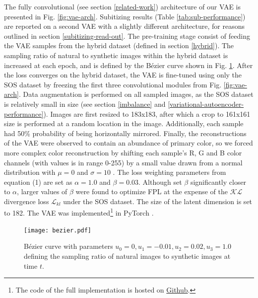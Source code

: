 \documentclass[twocolumn]{article}
\begin{document}
The fully convolutional (see section \ref{related-work}) architecture of our VAE is presented in Fig. \ref{fig:vae-arch}. Subitizing results (Table \ref{tab:sub-performance}) are reported on a second VAE with a slightly different architecture, for reasons outlined in section \ref{subitizing-read-out}.
The pre-training stage consist of feeding the VAE samples from the hybrid dataset (defined in section \ref{hybrid}). The sampling ratio of natural to synthetic images within the hybrid dataset is increased at each epoch, and is defined by the Bézier curve shown in Fig. \ref{fig:bezier}. After the loss converges on the hybrid dataset, the VAE is fine-tuned using only the SOS dataset by freezing the first three convolutional modules from Fig. \ref{fig:vae-arch}.  Data augmentation is performed on all sampled images, as the SOS dataset is relatively small in size (see section \ref{imbalance} and \ref{variational-autoencoder-performance}).  Images are first resized to 183x183, after which a crop to 161x161 size is performed at a random location in the image. Additionally, each sample had 50\% probability of being horizontally mirrored. Finally, the reconstructions of the VAE were observed to contain an abundance of primary color, so we forced more complex color reconstruction by shifting each sample's R, G and B color channels (with values is in range 0-255) by a small value drawn from a normal distribution with \(\mu=0\) and \(\sigma=10\) \citep[the G channel uses \(\sigma=3.5\) because heavy green shifts produced unrealistic samples, possibly because green lighting contributes most to human color intensity perception][]{anderson1996proposal}. The loss weighting parameters from equation (1) are set as \(\alpha=1.0\) and \(\beta=0.03\). Although \citet{hou2017deep} set \(\beta\) significantly closer to \(\alpha\), larger values of \(\beta\) were found to optimize FPL at the expense of the \(\mathcal{KL}\) divergence loss \(\mathcal{L}_{kl}\) under the SOS dataset. The size of the latent dimension is set to 182. The VAE was implemented\footnote{The code of the full implementation is hosted on \href{https://github.com/rien333/numbersense-vae}{Github}.} in PyTorch \citep{paszke2017automatic}. 

\begin{figure}
\centering
\texttt{[image: bezier.pdf]}
\caption{Bézier curve with parameters
\(u_0=0, u_1=-0.01, u_2=0.02, u_3=1.0\) defining the sampling ratio of natural images to synthetic images at time \(t\). }
\label{fig:bezier}
\end{figure}
\end{document}
